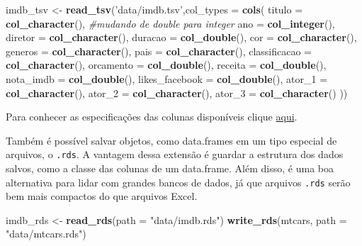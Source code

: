 \documentclass[]{book}
\newenvironment{Shaded}{\begin{snugshade}}{\end{snugshade}}
\newcommand{\CommentTok}[1]{\textcolor[rgb]{0.56,0.35,0.01}{\textit{#1}}}
\newcommand{\DataTypeTok}[1]{\textcolor[rgb]{0.13,0.29,0.53}{#1}}
\newcommand{\KeywordTok}[1]{\textcolor[rgb]{0.13,0.29,0.53}{\textbf{#1}}}
\newcommand{\NormalTok}[1]{#1}
\newcommand{\StringTok}[1]{\textcolor[rgb]{0.31,0.60,0.02}{#1}}
\begin{document}
\begin{Shaded}
\begin{Highlighting}[]
\NormalTok{imdb_tsv <-}\StringTok{ }\KeywordTok{read_tsv}\NormalTok{(}\StringTok{'data/imdb.tsv'}\NormalTok{,}\DataTypeTok{col_types =}  
 \KeywordTok{cols}\NormalTok{(}
  \DataTypeTok{titulo =} \KeywordTok{col_character}\NormalTok{(),}
  \CommentTok{#mudando de double para integer}
  \DataTypeTok{ano =} \KeywordTok{col_integer}\NormalTok{(),}
  \DataTypeTok{diretor =} \KeywordTok{col_character}\NormalTok{(),}
  \DataTypeTok{duracao =} \KeywordTok{col_double}\NormalTok{(),}
  \DataTypeTok{cor =} \KeywordTok{col_character}\NormalTok{(),}
  \DataTypeTok{generos =} \KeywordTok{col_character}\NormalTok{(),}
  \DataTypeTok{pais =} \KeywordTok{col_character}\NormalTok{(),}
  \DataTypeTok{classificacao =} \KeywordTok{col_character}\NormalTok{(),}
  \DataTypeTok{orcamento =} \KeywordTok{col_double}\NormalTok{(),}
  \DataTypeTok{receita =} \KeywordTok{col_double}\NormalTok{(),}
  \DataTypeTok{nota_imdb =} \KeywordTok{col_double}\NormalTok{(),}
  \DataTypeTok{likes_facebook =} \KeywordTok{col_double}\NormalTok{(),}
  \DataTypeTok{ator_1 =} \KeywordTok{col_character}\NormalTok{(),}
  \DataTypeTok{ator_2 =} \KeywordTok{col_character}\NormalTok{(),}
  \DataTypeTok{ator_3 =} \KeywordTok{col_character}\NormalTok{()}
\NormalTok{))}
\end{Highlighting}
\end{Shaded}

Para conhecer as especificações das colunas disponíveis clique \href{https://readr.tidyverse.org/articles/readr.html\#available-column-specifications}{aqui}.

Também é possível salvar objetos, como data.frames em um tipo especial de arquivos, o \texttt{.rds}. A vantagem dessa extensão é guardar a estrutura dos dados salvos, como a classe das colunas de um data.frame. Além disso, é uma boa alternativa para lidar com grandes bancos de dados, já que arquivos \texttt{.rds} serão bem mais compactos do que arquivos Excel.

\begin{Shaded}
\begin{Highlighting}[]
\NormalTok{imdb_rds <-}\StringTok{ }\KeywordTok{read_rds}\NormalTok{(}\DataTypeTok{path =} \StringTok{"data/imdb.rds"}\NormalTok{)}
\KeywordTok{write_rds}\NormalTok{(mtcars, }\DataTypeTok{path =} \StringTok{"data/mtcars.rds"}\NormalTok{)}
\end{Highlighting}
\end{Shaded}
\end{document}
